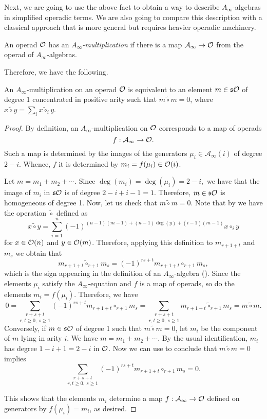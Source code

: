 \documentclass[Thesis.tex]{subfiles}
\begin{document}
Next, we are going to use the above fact to obtain a way to describe $A_\infty$-algebras in simplified operadic terms. We are also going to compare this description with a classical approach that is more general but requires heavier operadic machinery. 


\begin{defin}\label{ainftymult}
An operad ${\mathcal O}$ has an \emph{$A_\infty$-multiplication} if there is a map $\mathcal{A}_\infty\to{\mathcal O}$ from the operad of $A_\infty$-algebras.
\end{defin}

 Therefore, we have the following. 

\begin{lem}\label{twisting}
An $A_\infty$-multiplication on an operad ${\mathcal O}$ is equivalent to an element $m\in\mathfrak{s}{\mathcal O}$ of degree 1 concentrated in positive arity such that $m\tilde{\circ}m=0$, where $x\tilde{\circ} y=\sum_i x\tilde{\circ}_i y$. 
\end{lem}
\begin{proof}
By definition, an $A_\infty$-multiplication on ${\mathcal O}$ corresponds to a map of operads \[f:\mathcal{A}_\infty\to{\mathcal O}.\] Such a map is determined by the images of the generators $\mu_i\in\mathcal{A}_\infty(i)$ of degree $2-i$. Whence, $f$ it is determined by $m_i=f(\mu_i)\in{\mathcal O}(i)$. 

Let $m=m_1+m_2+\cdots$. Since $\deg(m_i)=\deg(\mu_i)=2-i,$
we have that the image of $m_i$ in $\mathfrak{s}{\mathcal O}$ is of degree $2-i+i-1=1$. Therefore, $m\in\mathfrak{s}{\mathcal O}$ is homogeneous of degree 1. Now, let us check that $m\tilde{\circ}m=0$. Note that by  we have the operation $\tilde{\circ}$ defined as
\[x\tilde{\circ}y=\sum_{i=1}^n(-1)^{(n-1)(m-1)+(n-1)\deg(y)+(i-1)(m-1)}x\circ_i y\]
for $x\in{\mathcal O}(n)$ and $y\in{\mathcal O}(m)$. Therefore, applying this definition to $m_{r+1+t}$ and $m_s$ we obtain that
\begin{equation}\label{tildequation}
m_{r+1+t}\tilde{\circ }_{r+1}m_s=(-1)^{rs+t}m_{r+1+t}\circ_{r+1} m_s,
\end{equation}
which is the sign appearing in the definition of an $A_\infty$-algebra (). Since the elements $\mu_i$ satisfy the $A_\infty$-equation and $f$ is a map of operads, so do the elements $m_i=f(\mu_i)$. Therefore, we have
\[0=\underset{r,t\geq 0,\ s\geq 1}{\sum_{r+s+t}}(-1)^{rs+t}m_{r+1+t}\circ_{r+1} m_s=\underset{r,t\geq 0,\ s\geq 1}{\sum_{r+s+t}}m_{r+1+t}\tilde{\circ}_{r+1}m_s=m\tilde{\circ}m.\] 
Conversely, if $m\in\mathfrak{s}{\mathcal O}$ of degree 1 such that $m\tilde{\circ}m=0$, let $m_i$ be the component of $m$ lying in arity $i$. We have $m=m_1+m_2+\cdots$. By the usual identification, $m_i$ has degree $1-i+1=2-i$ in ${\mathcal O}$. Now we can use  to conclude that $m\tilde{\circ}m=0$ implies 
\[\underset{r,t\geq 0,\ s\geq 1}{\sum_{r+s+t}}(-1)^{rs+t}m_{r+1+t}\circ_{r+1} m_s=0.\]

This shows that the elements $m_i$ determine a map $f:\mathcal{A}_\infty\to{\mathcal O}$ defined on generators by $f(\mu_i)=m_i$, as desired. 
\end{proof}
\end{document}
